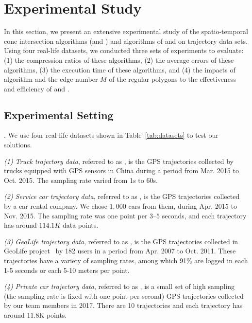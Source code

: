 \section{Experimental Study} %
\label{sec-exp}
In this section, we present an extensive experimental study of the spatio-temporal cone intersection algorithms (\cist and \cista) and algorithms of \dpa and \squishe on trajectory data sets.
Using four real-life datasets, we conducted three sets of experiments to evaluate:
(1) the compression ratios of these algorithms,
(2) the average errors of these algorithms,
(3) the execution time of these algorithms, and
(4) the impacts of algorithm \rpia and the edge number $M$ of the regular polygons to the effectiveness and efficiency of \cist and \cista.


\subsection{Experimental Setting}

.
We use four real-life datasets shown in Table~\ref{tab:datasets} to test our solutions.

\ni \emph{(1) Truck trajectory data}, referred to as \truck, is the GPS trajectories collected by  trucks equipped with GPS sensors in China
during a period from Mar. 2015 to Oct. 2015. The sampling rate varied from 1s to 60s.

\ni \emph{(2) Service car trajectory data}, referred to as \sercar,  is the GPS trajectories collected by a car rental company.
We chose $1,000$ cars from them, during Apr. 2015 to Nov. 2015. The sampling rate was one point per $3$--$5$ seconds, and
each trajectory has around $114.1K$ data points.

\ni \emph{(3) GeoLife trajectory data}, referred to as \geolife, is the GPS trajectories collected in GeoLife project~\cite{Zheng:GeoLife} by 182 users in a period from Apr. 2007 to Oct. 2011. These trajectories have a variety of sampling rates, among which 91\% are logged in each 1-5 seconds or each 5-10 meters per point.

\ni \emph{(4) Private car trajectory data}, referred to as \pricar, is a small set of high sampling (the sampling rate is fixed with one point per second) GPS trajectories collected by our team members in 2017. There are 10 trajectories and each trajectory has around 11.8K points.


